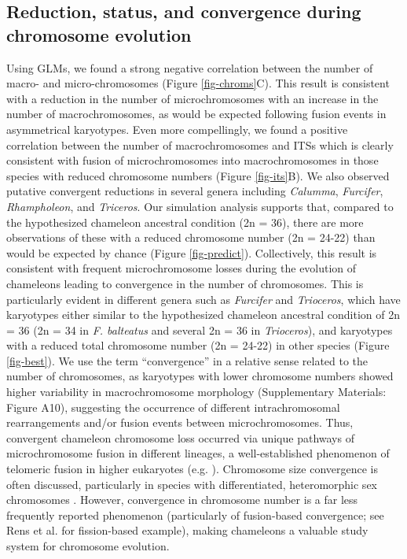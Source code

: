 \documentclass[a4paper, 12pt]{article}
\begin{document}
\subsection{Reduction, status, and convergence during chromosome evolution}
Using GLMs, we found a strong negative correlation between the number of macro- and micro-chromosomes (Figure \ref{fig-chroms}C). 
This result is consistent with a reduction in the number of microchromosomes with an increase in the number of macrochromosomes, as would be expected following fusion events in asymmetrical karyotypes. 
Even more compellingly, we found a positive correlation between the number of macrochromosomes and ITSs which is clearly consistent with fusion of microchromosomes into macrochromosomes in those species with reduced chromosome numbers (Figure \ref{fig-its}B). 
We also observed putative convergent reductions in several genera including \textit{Calumma}, \textit{Furcifer}, \textit{Rhampholeon}, and \textit{Triceros}. 
Our simulation analysis supports that, compared to the hypothesized chameleon ancestral condition (2n = 36), there are more observations of these with a reduced chromosome number (2n = 24-22) than would be expected by chance (Figure \ref{fig-predict}). 
Collectively, this result is consistent with frequent microchromosome losses during the evolution of chameleons leading to convergence in the number of chromosomes. 
This is particularly evident in different genera such as \textit{Furcifer} and \textit{Trioceros}, which have karyotypes either similar to the hypothesized chameleon ancestral condition of 2n = 36 (2n = 34 in \textit{F. balteatus} and several 2n = 36 in \textit{Trioceros}), and karyotypes with a reduced total chromosome number (2n = 24-22) in other species (Figure \ref{fig-best}). 
We use the term ``convergence'' in a relative sense related to the number of chromosomes, as karyotypes with lower chromosome numbers showed higher variability in macrochromosome morphology (Supplementary Materials: Figure A10), suggesting the occurrence of different intrachromosomal rearrangements and/or fusion events between microchromosomes. 
Thus, convergent chameleon chromosome loss occurred via unique pathways of microchromosome fusion in different lineages, a well-established phenomenon of telomeric fusion in higher eukaryotes (e.g. \citealt{heacock2004molecular}).  
Chromosome size convergence is often discussed, particularly in species with differentiated, heteromorphic sex chromosomes \citep{montiel2017discovery,kratochvil2021sex}. 
However, convergence in chromosome number is a far less frequently reported phenomenon (particularly of fusion-based convergence; see Rens et al. \citeyear{rens2003reversal} for fission-based example), making chameleons a valuable study system for chromosome evolution. 
\end{document}
